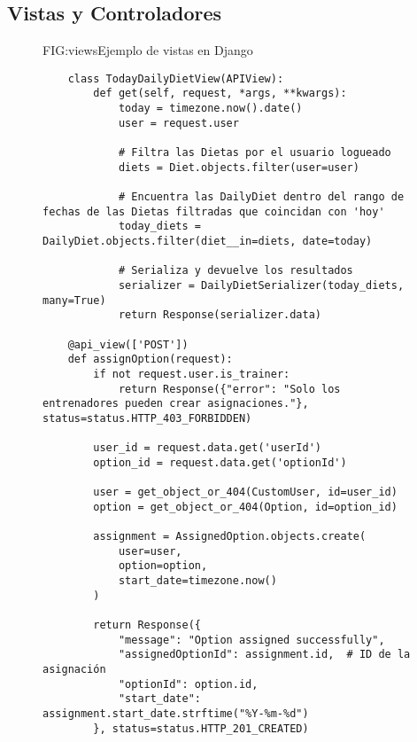 \subsection{Vistas y Controladores}
\begin{figure}[Ejemplo Código Vistas]{FIG:views}{Ejemplo de vistas en Django}
    \begin{verbatim}
    class TodayDailyDietView(APIView):
        def get(self, request, *args, **kwargs):
            today = timezone.now().date()
            user = request.user
            
            # Filtra las Dietas por el usuario logueado
            diets = Diet.objects.filter(user=user)
            
            # Encuentra las DailyDiet dentro del rango de fechas de las Dietas filtradas que coincidan con 'hoy'
            today_diets = DailyDiet.objects.filter(diet__in=diets, date=today)
            
            # Serializa y devuelve los resultados
            serializer = DailyDietSerializer(today_diets, many=True)
            return Response(serializer.data)

    @api_view(['POST'])
    def assignOption(request):
        if not request.user.is_trainer:
            return Response({"error": "Solo los entrenadores pueden crear asignaciones."}, status=status.HTTP_403_FORBIDDEN)
        
        user_id = request.data.get('userId')
        option_id = request.data.get('optionId')
    
        user = get_object_or_404(CustomUser, id=user_id)
        option = get_object_or_404(Option, id=option_id)
    
        assignment = AssignedOption.objects.create(
            user=user,
            option=option,
            start_date=timezone.now()
        )
    
        return Response({
            "message": "Option assigned successfully",
            "assignedOptionId": assignment.id,  # ID de la asignación
            "optionId": option.id,
            "start_date": assignment.start_date.strftime("%Y-%m-%d")
        }, status=status.HTTP_201_CREATED)
    \end{verbatim}
    \end{figure}

\newpage

